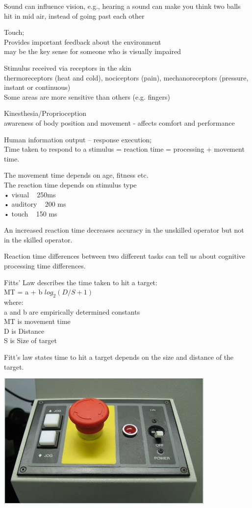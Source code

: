 \documentclass[]{project_plan}
\begin{document}
Sound can influence vision, e.g., hearing a sound can make you think two balls hit in mid air, instead of going past each other

Touch;\\
Provides important feedback about the environment\\
may be the key sense for someone who is visually impaired

Stimulus received via receptors in the skin\\
thermoreceptors (heat and cold), nociceptors (pain),  mechanoreceptors (pressure, instant or continuous)\\
Some areas are more sensitive than others (e.g. fingers)

Kinesthesia/Proprioception\\
awareness of body position and movement - affects comfort and performance

Human information output – response execution;\\
Time taken to respond to a stimulus = reaction time = processing + movement time.

The movement time depends on age, fitness etc.\\
The reaction time depends on stimulus type\\
• visual ~ 250ms\\
• auditory ~ 200 ms\\
• touch ~ 150 ms

An increased reaction time decreases accuracy in the unskilled operator but not in the skilled operator.

Reaction time differences between two different tasks can tell us about cognitive processing time differences.

Fitts' Law describes the time taken to hit a target:\\
MT = a + b $log_2(D/S + 1)$\\
where:\\
a and b are empirically determined constants\\
MT is movement time\\
D is Distance\\
S is Size of target

Fitt’s law states time to hit a target depends on the size and distance of the target.

\newpage

\includegraphics[width=0.5\linewidth]{fitts_law_eg.png}
\end{document}
